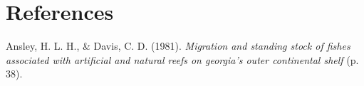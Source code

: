 \documentclass[
  11pt,
  letterpaper,
  oneside,
  open=any]{scrbook}
\newlength{\cslhangindent}
\newlength{\cslentryspacingunit} %
\newenvironment{CSLReferences}[2] %
 {%
  \setlength{\parindent}{0pt}
  \ifodd #1
  \let\oldpar\par
  \def\par{\hangindent=\cslhangindent\oldpar}
  \fi
  \setlength{\parskip}{#2\cslentryspacingunit}
 }%
 {}
\begin{document}

\hypertarget{references-2}{%
\chapter*{References}\label{references-2}}


\hypertarget{refs}{}
\begin{CSLReferences}{1}{0}
\leavevmode{}%
Ansley, H. L. H., \& Davis, C. D. (1981). \emph{Migration and standing
stock of fishes associated with artificial and natural reefs on
georgia{'}s outer continental shelf} (p. 38).

\end{CSLReferences}


\backmatter
\end{document}
